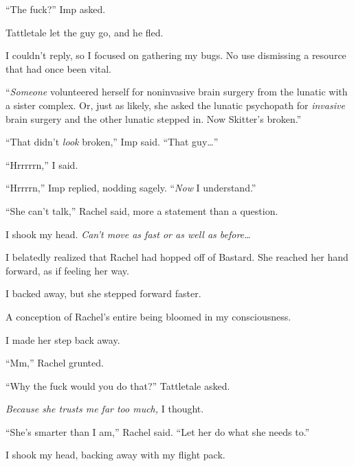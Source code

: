 ``The fuck?'' Imp asked.



Tattletale let the guy go, and he fled.



I couldn't reply, so I focused on gathering my bugs.  No use dismissing a resource that had once been vital.



``\emph{Someone} volunteered herself for noninvasive brain surgery from the lunatic with a sister complex.  Or, just as likely, she asked the lunatic psychopath for \emph{invasive} brain surgery and the other lunatic stepped in.  Now Skitter's broken.''



``That didn't \emph{look} broken,'' Imp said.  ``That guy\ldots''



``Hrrrrrn,'' I said.



``Hrrrrn,'' Imp replied, nodding sagely.  ``\emph{Now} I understand.''



``She can't talk,'' Rachel said, more a statement than a question.



I shook my head.  \emph{Can't move as fast or as well as before\ldots}



I belatedly realized that Rachel had hopped off of Bastard.  She reached her hand forward, as if feeling her way.



I backed away, but she stepped forward faster.



A conception of Rachel's entire being bloomed in my consciousness.



I made her step back away.



``Mm,'' Rachel grunted.



``Why the fuck would you do that?'' Tattletale asked.



\emph{Because she trusts me far too much, }I thought.



``She's smarter than I am,'' Rachel said.  ``Let her do what she needs to.''



I shook my head, backing away with my flight pack.



